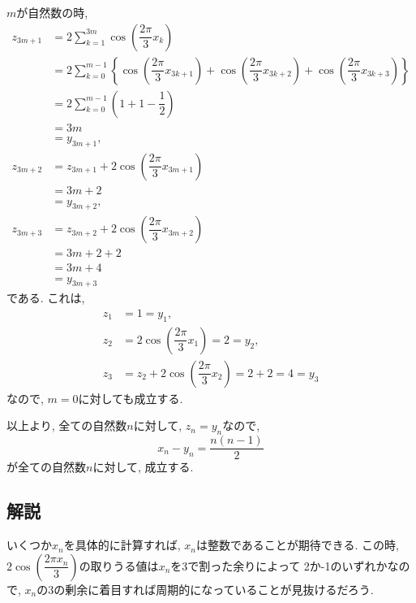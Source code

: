 \documentclass[dvipdfmx,a4paper]{jsarticle}
\begin{document}
    $m$が自然数の時, 
    \begin{align*}
        z_{3m+1} &= 2 \sum_{k=1}^{3m} \cos \left( \dfrac{2\pi}{3}x_k\right) \\
        &= 2 \sum_{k=0}^{m-1} \left\{\cos \left( \dfrac{2\pi}{3}x_{3k+1}\right) + \cos \left( \dfrac{2\pi}{3}x_{3k+2}\right) + \cos \left( \dfrac{2\pi}{3}x_{3k+3}\right)\right\} \\
        &= 2 \sum_{k=0}^{m-1} \left(1 + 1 - \dfrac{1}{2}\right) \\
        &= 3m \\
        &= y_{3m+1}, \\
        z_{3m+2} &= z_{3m+1} + 2\cos \left( \dfrac{2\pi}{3}x_{3m+1}\right)\\
        &= 3m + 2\\
        &= y_{3m+2}, \\
        z_{3m+3} &= z_{3m+2} + 2\cos \left( \dfrac{2\pi}{3}x_{3m+2}\right)\\
        &= 3m + 2 + 2\\
        &= 3m + 4\\
        &= y_{3m+3}
    \end{align*}
    である. これは, 
    \begin{align*}
        z_1 &= 1 = y_1, \\
        z_2 &= 2\cos \left( \dfrac{2\pi}{3}x_1\right) = 2 = y_2, \\
        z_3 &= z_2 + 2\cos \left( \dfrac{2\pi}{3}x_2\right) 
        = 2 + 2
        = 4
        = y_3
    \end{align*}
    なので, $m=0$に対しても成立する. 

    以上より, 全ての自然数$n$に対して, $z_n = y_n$なので, 
    \begin{equation*}
        x_n - y_n = \dfrac{n(n-1)}{2}
    \end{equation*}
    が全ての自然数$n$に対して, 成立する. 

    \subsection{解説}
    いくつか$x_n$を具体的に計算すれば, $x_n$は整数であることが期待できる. 
    この時, $2\cos\left( \dfrac{2\pi x_n}{3} \right)$の取りうる値は$x_n$を3で割った余りによって
    2か-1のいずれかなので, $x_n$の3の剰余に着目すれば周期的になっていることが見抜けるだろう. 
\end{document}
